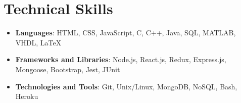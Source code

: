 \documentclass[letterpaper,11pt]{article}
\newcommand{\resumeItemUpdated}[1]{
  \item\small{
    {#1 \vspace{-7pt}}
  }
}
\newcommand{\resumeItemListStart}{\begin{itemize}[leftmargin=*]}
\newcommand{\resumeItemListEnd}{\end{itemize}\vspace{-5pt}}
\begin{document}
\section{Technical Skills}
   \resumeItemListStart
        \resumeItemUpdated
          {\textbf{Languages}{: HTML, CSS, JavaScript, C, C++, Java, SQL, MATLAB, VHDL, \LaTeX }}
        \resumeItemUpdated
          {\textbf{Frameworks and Libraries}{: Node.js, React.js, Redux, Express.js, Mongoose, Bootstrap, Jest, JUnit }}
        \resumeItemUpdated
          {\textbf{Technologies and Tools}{: Git, Unix/Linux, MongoDB, NoSQL, Bash, Heroku}}
   \resumeItemListEnd


\end{document}
